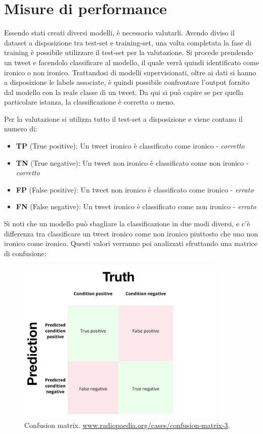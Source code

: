 \documentclass[oneside]{book}
\begin{document}
\section{Misure di performance}
Essendo stati creati diversi modelli, è necessario valutarli. Avendo diviso il dataset a disposizione tra test-set e training-set, una volta completata la fase di training è possibile utilizzare il test-set per la valutazione. Si procede prendendo un tweet e facendolo classificare al modello, il quale verrà quindi identificato come ironico o non ironico. Trattandosi di modelli supervisionati, oltre ai dati si hanno a disposizione le labels associate, è quindi possibile confrontare l'output fornito dal modello con la reale classe di un tweet. Da qui si può capire se per quella particolare istanza, la classificazione è corretta o meno.

Per la valutazione si utilizza tutto il test-set a disposizione e viene contano il numero di:
\begin{itemize}
	\item \textbf{TP} (True positive): Un tweet ironico è classificato come ironico - \emph{corretto}
	
	\item \textbf{TN} (True negative): Un tweet non ironico è classificato come non ironico - \emph{corretto}
	
	\item \textbf{FP} (False positive):	Un tweet non ironico è classificato come ironico - \emph{errato}
	
	\item \textbf{FN} (False negative):	Un tweet ironico è classificato come non ironico - \emph{errato}
\end{itemize}
Si noti che un modello può sbagliare la classificazione in due modi diversi, e c'è differenza tra classificare un tweet ironico come non ironico piuttosto che uno non ironico come ironico. Questi valori verranno poi analizzati sfruttando una matrice di confusione:

\begin{figure}[!h]
	\centering
	\includegraphics[width=10cm]{assets/confusion-matrix.jpg}
	\caption{Confusion matrix. \url{www.radiopaedia.org/cases/confusion-matrix-3}.}
	\label{fig:decision-tree}
\end{figure}
\end{document}
